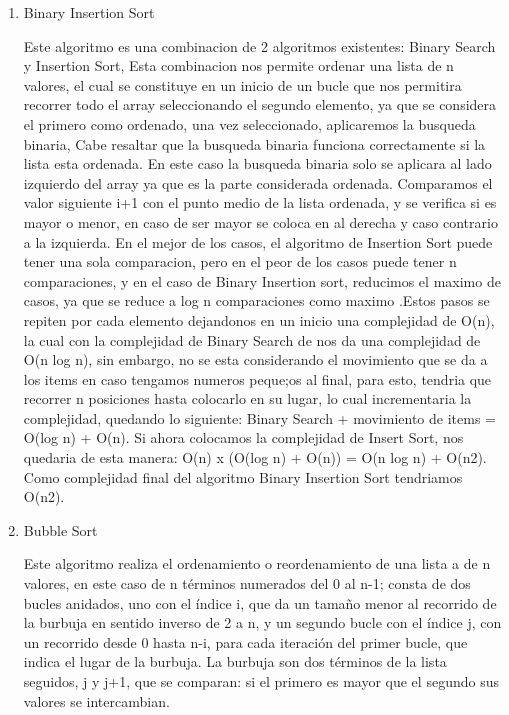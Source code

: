 \documentclass[12pt]{article} %
\begin{document}
\begin{enumerate}
    \item Binary Insertion Sort
        
        Este algoritmo es una combinacion de 2 algoritmos existentes: Binary Search y Insertion Sort,
        Esta combinacion nos permite ordenar una lista de n valores, el cual se constituye en un inicio de un bucle que nos permitira recorrer todo el array
        seleccionando el segundo elemento, ya que se considera el primero como ordenado, una vez seleccionado, aplicaremos la busqueda binaria, Cabe resaltar que la busqueda binaria funciona correctamente si la lista esta ordenada.
        En este caso la busqueda binaria solo se aplicara al lado izquierdo del array ya que es la parte considerada ordenada. Comparamos el valor siguiente i+1 con el punto medio de la lista ordenada,
        y se verifica si es mayor o menor, en caso de ser mayor se coloca en al derecha y caso contrario a la izquierda. En el mejor de los casos, el algoritmo de Insertion Sort puede tener una sola comparacion, pero en el peor
        de los casos puede tener n comparaciones, y en el caso de Binary Insertion sort, reducimos el maximo de casos, ya que se reduce a log n comparaciones como maximo .Estos pasos se repiten por cada elemento dejandonos en un inicio una complejidad de O(n),
        la cual con la complejidad de Binary Search de nos da una complejidad de O(n log n), sin embargo, no se esta considerando el movimiento que se da a los items en caso tengamos numeros peque;os al final, para esto, tendria que recorrer
        n posiciones hasta colocarlo en su lugar, lo cual incrementaria la complejidad, quedando lo siguiente: Binary Search + movimiento de items = O(log n) + O(n). Si ahora colocamos la complejidad de Insert Sort, nos quedaria de esta manera:
        O(n) x (O(log n) + O(n)) = O(n log n) + O(n2). Como complejidad final del algoritmo Binary Insertion Sort tendriamos O(n2).


    \item Bubble Sort
    
          Este algoritmo realiza el ordenamiento o reordenamiento de una lista a de n valores, en este caso de n términos numerados del 0 al n-1; consta de dos bucles anidados, uno con el índice i, que da un tamaño menor al recorrido de la burbuja en sentido inverso de 2 a n, y un segundo bucle con el índice j,
          con un recorrido desde 0 hasta n-i, para cada iteración del primer bucle, que indica el lugar de la burbuja. La burbuja son dos términos de la lista seguidos, j y j+1, que se comparan: si el primero es mayor que el segundo sus valores se intercambian.


\end{enumerate}
\end{document}
